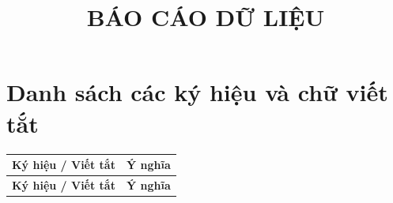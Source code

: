 \documentclass[oneside]{hcmus-report}
\title{BÁO CÁO DỮ LIỆU}
\begin{document}
\coverpage%

\tableofcontents

\clearpage
{}
{}
\listoffigures

\clearpage
{}
{}
\listoftables


\clearpage
{}
\section*{Danh sách các ký hiệu và chữ viết tắt}

\begin{longtable}{p{} p{}}
\textbf{Ký hiệu / Viết tắt} & \textbf{Ý nghĩa} \\
\hline
\endfirsthead
\textbf{Ký hiệu / Viết tắt} & \textbf{Ý nghĩa} \\
\hline
\endhead


\end{longtable}
\end{document}
